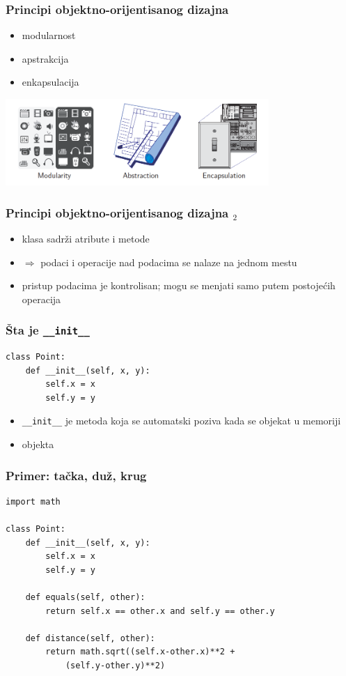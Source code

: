\documentclass[utf8,compress]{beamer}
\begin{document}
\begin{frame}[fragile]
  \frametitle{Principi objektno-orijentisanog dizajna}
  \begin{itemize}
    \item modularnost
    \item apstrakcija
    \item enkapsulacija
  \end{itemize}
\begin{center}
  \includegraphics[width=10cm]{pic32.png}
\end{center}
\end{frame}

\begin{frame}[fragile]
  \frametitle{Principi objektno-orijentisanog dizajna $_2$}
  \begin{itemize}
    \item klasa sadrži atribute i metode
    \item $\Rightarrow$ podaci i operacije nad podacima se nalaze na jednom mestu
    \item pristup podacima je kontrolisan; mogu se menjati samo putem postojećih operacija
  \end{itemize}
\end{frame}

\begin{frame}[fragile]
  \frametitle{Šta je \texttt{\_\_init\_\_}}
\begin{verbatim}
class Point:
    def __init__(self, x, y):
        self.x = x
        self.y = y
\end{verbatim}
  \begin{itemize}
    \item \texttt{\_\_init\_\_} je metoda koja se automatski poziva kada se objekat  u memoriji
    \item {} objekta
  \end{itemize}
\end{frame}

\begin{frame}
  \frametitle{Primer: tačka, duž, krug}
\begin{verbatim}
import math

class Point:
    def __init__(self, x, y):
        self.x = x
        self.y = y

    def equals(self, other):
        return self.x == other.x and self.y == other.y

    def distance(self, other):
        return math.sqrt((self.x-other.x)**2 + 
            (self.y-other.y)**2)
\end{verbatim}
\end{frame}
\end{document}
